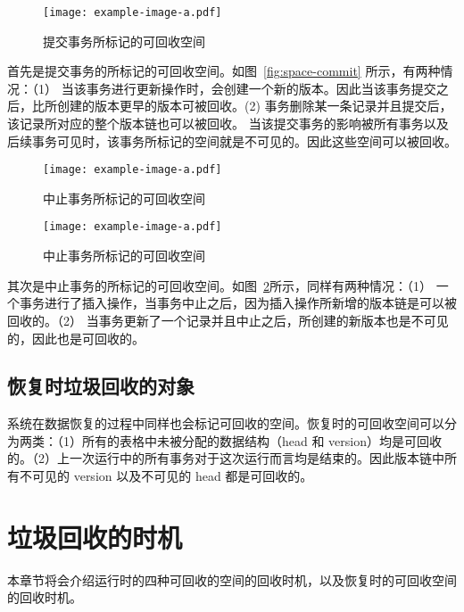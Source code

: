 \begin{figure}
    \centering
    \texttt{[image: example-image-a.pdf]}
    \caption{提交事务所标记的可回收空间}
    \label{fig:space-commit2}
\end{figure}

首先是提交事务的所标记的可回收空间。如图~\ref{fig:space-commit} 所示，有两种情况：（1） 当该事务进行更新操作时，会创建一个新的版本。因此当该事务提交之后，比所创建的版本更早的版本可被回收。(2) 事务删除某一条记录并且提交后，该记录所对应的整个版本链也可以被回收。 当该提交事务的影响被所有事务以及后续事务可见时，该事务所标记的空间就是不可见的。因此这些空间可以被回收。

\begin{figure}
    \centering
    \texttt{[image: example-image-a.pdf]}
    \caption{中止事务所标记的可回收空间}
    \label{fig:space-abort}
\end{figure}

\begin{figure}
    \centering
    \texttt{[image: example-image-a.pdf]}
    \caption{中止事务所标记的可回收空间}
    \label{fig:space-abort2}
\end{figure}

其次是中止事务的所标记的可回收空间。如图~\ref{fig:space-abort}所示，同样有两种情况：（1） 一个事务进行了插入操作，当事务中止之后，因为插入操作所新增的版本链是可以被回收的。（2） 当事务更新了一个记录并且中止之后，所创建的新版本也是不可见的，因此也是可回收的。

\subsection{恢复时垃圾回收的对象}

系统在数据恢复的过程中同样也会标记可回收的空间。恢复时的可回收空间可以分为两类：（1）所有的表格中未被分配的数据结构（head 和 version）均是可回收的。（2）上一次运行中的所有事务对于这次运行而言均是结束的。因此版本链中所有不可见的 version 以及不可见的 head 都是可回收的。

\section{垃圾回收的时机}
\label{sec:time}

本章节将会介绍运行时的四种可回收的空间的回收时机，以及恢复时的可回收空间的回收时机。

